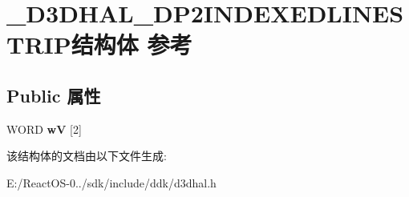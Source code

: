 \hypertarget{struct___d3_d_h_a_l___d_p2_i_n_d_e_x_e_d_l_i_n_e_s_t_r_i_p}{}\section{\+\_\+\+D3\+D\+H\+A\+L\+\_\+\+D\+P2\+I\+N\+D\+E\+X\+E\+D\+L\+I\+N\+E\+S\+T\+R\+I\+P结构体 参考}
\label{struct___d3_d_h_a_l___d_p2_i_n_d_e_x_e_d_l_i_n_e_s_t_r_i_p}
\subsection*{Public 属性}
\begin{DoxyCompactItemize}
\item 
\mbox{\label{struct___d3_d_h_a_l___d_p2_i_n_d_e_x_e_d_l_i_n_e_s_t_r_i_p_a66bd1640ed2596a4b3e0410554f20115}} 
W\+O\+RD {\bfseries wV} \mbox{[}2\mbox{]}
\end{DoxyCompactItemize}


该结构体的文档由以下文件生成\+:\begin{DoxyCompactItemize}
\item 
E\+:/\+React\+O\+S-\/0../sdk/include/ddk/d3dhal.\+h\end{DoxyCompactItemize}
